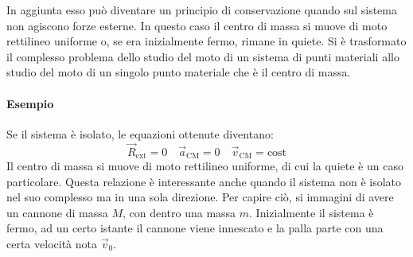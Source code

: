 \documentclass[10pt,a4paper]{book}
\begin{document}
In aggiunta esso può diventare un principio di conservazione quando sul sistema non agiscono forze esterne. In questo caso il centro di massa si muove di moto rettilineo uniforme o, se era inizialmente fermo, rimane in quiete.
Si è trasformato il complesso problema dello studio del moto di un sistema di punti materiali allo studio del moto di un singolo punto materiale che è il centro di massa.

\paragraph{Esempio} Se il sistema è isolato, le equazioni ottenute diventano:
\[
	\vec{R}_\text{ext}=0 \quad \vec{a}_\text{CM}=0 \quad \vec{v}_\text{CM}=\text{cost}
\]
Il centro di massa si muove di moto rettilineo uniforme, di cui la quiete è un caso particolare. Questa relazione è interessante anche quando il sistema non è isolato nel suo complesso ma in una sola direzione. Per capire ciò, si immagini di avere un cannone di massa $M$, con dentro una massa $m$. Inizialmente il sistema è fermo, ad un certo istante il cannone viene innescato e la palla parte con una certa velocità nota $\vec{v}_0$.
\end{document}
